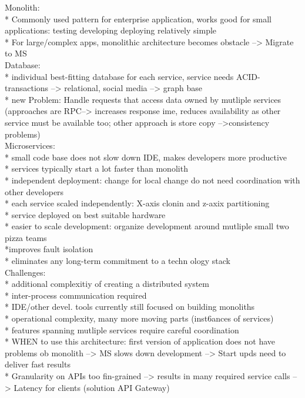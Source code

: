 Monolith: \\
* Commonly used pattern for enterprise application, works good for small applications: testing developing deploying relatively simple\\
* For large/complex apps, monolithic architecture becomes  obstacle --> Migrate to MS\\

Database: \\
* individual best-fitting database for each service, service needs ACID-transactions --> relational, social media --> graph base\\
* new Problem: Handle requests that access data owned by mutliple services (approaches are RPC--> increases response ime, reduces availability as other service must be available too; other approach is store copy -->consistency problems)\\

Microservices:\\
* small code base does not slow down IDE, makes developers more productive\\
* services typically start a lot faster than monolith\\
* independent deployment: change for local change do not need coordination with other developers	\\
* each service scaled independently: X-axis clonin and z-axix partitioning\\
* service deployed on best suitable hardware\\
* easier to scale development: organize development around mutliple small two pizza teams\\
*improves fault isolation\\
* eliminates any long-term commitment to a techn ology stack\\


Challenges: \\
* additional complexitiy of creating a distributed system\\
* inter-process communication required\\
* IDE/other devel. tools currently still focused on building monoliths\\
* operational complexity, many more moving parts (inst6ances of services)\\
* features spanning mutliple services require careful coordination\\
* WHEN to use this architecture: first version  of application does not have problems ob monolith --> MS slows down development --> Start upds need to deliver fast results\\
* Granularity on APIs too fin-grained --> results in many required service calls --> Latency for clients (solution API Gateway)\\

